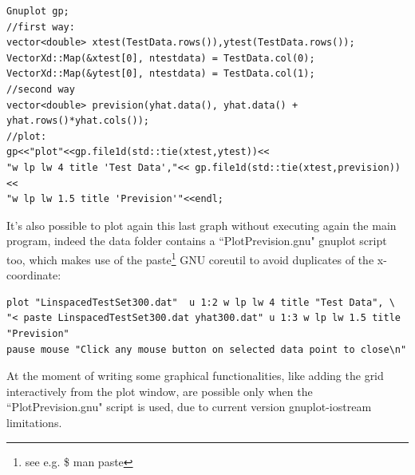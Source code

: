 \documentclass[12pt, a4paper]{report}
\theoremstyle{definition}
\begin{document}
{\begin{lstlisting}[frame=single, showstringspaces=false]
Gnuplot gp;
//first way:
vector<double> xtest(TestData.rows()),ytest(TestData.rows());
VectorXd::Map(&xtest[0], ntestdata) = TestData.col(0);
VectorXd::Map(&ytest[0], ntestdata) = TestData.col(1);
//second way
vector<double> prevision(yhat.data(), yhat.data() + yhat.rows()*yhat.cols());
//plot:
gp<<"plot"<<gp.file1d(std::tie(xtest,ytest))<<
"w lp lw 4 title 'Test Data',"<< gp.file1d(std::tie(xtest,prevision))<<
"w lp lw 1.5 title 'Prevision'"<<endl;
\end{lstlisting}
It's also possible to plot again this last graph without executing again the main program, indeed the data folder contains a ``PlotPrevision.gnu" gnuplot script too, which makes use of the {\ttfamily paste}\footnote{ see e.g. {\ttfamily \$ man paste}} GNU coreutil to avoid duplicates of the x-coordinate:
\begin{lstlisting}[frame=single, showstringspaces=false]
plot "LinspacedTestSet300.dat"	u 1:2 w lp lw 4 title "Test Data", \
"< paste LinspacedTestSet300.dat yhat300.dat" u 1:3 w lp lw 1.5 title "Prevision"
pause mouse "Click any mouse button on selected data point to close\n"
\end{lstlisting}
At the moment of writing some graphical functionalities, like adding the grid interactively from the plot window, are possible only when the ``PlotPrevision.gnu" script is used, due to current version gnuplot-iostream limitations.




}
\end{document}
